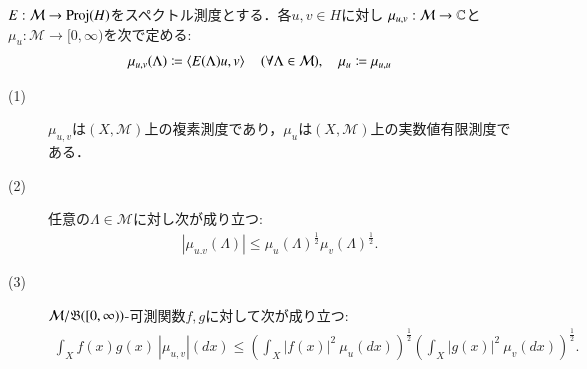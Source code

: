 	\begin{screen}
		\begin{lem}[スペクトル測度で導入する複素測度]
			$E:\mathcal{M} \rightarrow \mathrm{Proj}( H )$をスペクトル測度とする．各$u,v \in H$に対し
			$\mu_{u,v}:\mathcal{M} \rightarrow \mathbb{C}$と$\mu_u:\mathcal{M} \rightarrow [0,\infty)$を次で定める:
			\begin{align}
				\mu_{u,v}(\Lambda) \coloneqq \inprod<E(\Lambda)u,v> \quad (\forall \Lambda \in \mathcal{M}),
				\quad \mu_u \coloneqq \mu_{u,u}
				\label{eq:lem_complex_measure_introduced_by_spectral_measure_1}
			\end{align}
			\begin{description}
				\item[(1)] $\mu_{u,v}$は$(X,\mathcal{M})$上の複素測度であり，$\mu_u$は$(X,\mathcal{M})$上の実数値有限測度である．
				\item[(2)] 任意の$\Lambda \in \mathcal{M}$に対し次が成り立つ:
					\begin{align}
						|\mu_{u.v}(\Lambda)| \leq \mu_u(\Lambda)^{\frac{1}{2}} \mu_v(\Lambda)^{\frac{1}{2}}.
						\label{eq:lem_complex_measure_introduced_by_spectral_measure_3}
					\end{align}
				\item[(3)] $\mathcal{M}/\mathfrak{B}([0,\infty))$-可測関数$f,g$に対して次が成り立つ:
					\begin{align}
						\int_X f(x)g(x)\ |\mu_{u,v}|(dx) \leq \left( \int_X |f(x)|^2\ \mu_u(dx) \right)^{\frac{1}{2}} \left( \int_X |g(x)|^2\ \mu_v(dx) \right)^{\frac{1}{2}}.
					\end{align}
			\end{description}
			\label{lem:complex_measure_introduced_by_spectral_measure}
		\end{lem}
	\end{screen}
	
